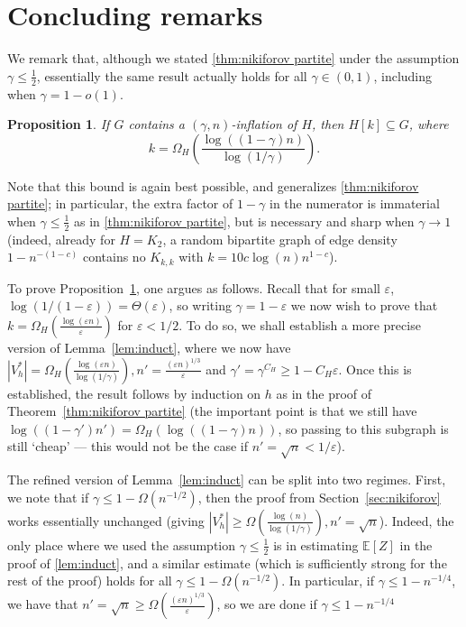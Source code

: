 \documentclass{aic}
\theoremstyle{plain}
\newtheorem{proposition}[theorem]{Proposition}
\theoremstyle{remark}
\def\E{\mathbb{E}}
\newcommand{\eps}{\ensuremath{\varepsilon}}
\begin{document}
\section{Concluding remarks}\label{sec:conclusion}
We remark that, although we stated \cref{thm:nikiforov partite} under the assumption $\gamma \leq \frac 12$, essentially the same result actually holds for all $\gamma \in (0,1)$, including when $\gamma = 1-o(1)$. 
\begin{proposition}\label{prop:gamma to 1}
    If $G$ contains a $(\gamma,n)$-inflation of $H$, then $H[k]\subseteq G$, where
    \[
    k = \Omega_H \left( \frac{\log((1-\gamma)n)}{\log(1/\gamma)}\right).
    \]
\end{proposition}
Note that this bound is again best possible, and generalizes \cref{thm:nikiforov partite}; in particular, the extra factor of $1-\gamma$ in the numerator is immaterial when $\gamma \leq \frac 12$ as in \cref{thm:nikiforov partite}, but is necessary and sharp when $\gamma \to 1$ (indeed, already for $H=K_2$, a random bipartite graph of edge density $1-n^{-(1-c)}$ contains no $K_{k,k}$ with $k=10c\log(n)n^{1-c}$). 



To prove Proposition~\ref{prop:gamma to 1}, one argues as follows.
Recall that for small $\eps$, $\log(1/(1-\eps)) = \Theta(\eps)$, so writing $\gamma = 1-\eps$ we now wish to prove that $k = \Omega_H( \frac{\log(\eps n)}{\eps})$ for $\eps<1/2$. 
To do so, we shall establish a more precise version of Lemma~\ref{lem:induct}, where we now have $|V_h^*| = \Omega_H(\frac{\log(\eps n)}{\log(1/\gamma)}), n'= \frac{(\eps n)^{1/3}}{\eps}$ and $\gamma' = \gamma^{C_H}\ge 1-C_H\eps$. Once this is established, the result follows by induction on $h$ as in the proof of Theorem~\ref{thm:nikiforov partite} (the important point is that we still have $\log((1-\gamma')n') = \Omega_H(\log((1-\gamma)n))$, so passing to this subgraph is still `cheap' --- this would not be the case if $n' = \sqrt{n}<1/\eps$).

The refined version of Lemma~\ref{lem:induct} can be split into two regimes. First, we note that if $\gamma \le 1-\Omega(n^{-1/2})$, then the proof from Section~\ref{sec:nikiforov} works essentially unchanged (giving $|V_h^*| \ge \Omega(\frac{\log(n)}{\log(1/\gamma)}),n' = \sqrt{n}$). Indeed, the only place where we used the assumption $\gamma \leq \frac 12$ is in estimating $\E[Z]$ in the proof of \cref{lem:induct}, and a similar estimate (which is sufficiently strong for the rest of the proof) holds for all $\gamma \leq 1-\Omega(n^{-1/2})$. In particular, if $\gamma \le 1-n^{-1/4}$, we have that $n' =\sqrt{n} \ge \Omega(\frac{(\eps n)^{1/3}}{\eps})$, so we are done if $\gamma \le 1-n^{-1/4}$
\end{document}
